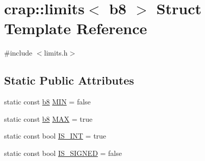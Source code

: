 \hypertarget{structcrap_1_1limits_3_01b8_01_4}{\section{crap\-:\-:limits$<$ b8 $>$ Struct Template Reference}
\label{structcrap_1_1limits_3_01b8_01_4}
}


{\ttfamily \#include $<$limits.\-h$>$}

\subsection*{Static Public Attributes}
\begin{DoxyCompactItemize}
\item 
static const \hyperlink{types_8h_a74eb47b4ab9e428eab7b91b3b877fa6c}{b8} \hyperlink{structcrap_1_1limits_3_01b8_01_4_ad7cee023c6e3c4ee5f1827e5becc110d}{M\-I\-N} = false
\item 
static const \hyperlink{types_8h_a74eb47b4ab9e428eab7b91b3b877fa6c}{b8} \hyperlink{structcrap_1_1limits_3_01b8_01_4_abb6122e7510a3d43e1e95a2543af6c0d}{M\-A\-X} = true
\item 
static const bool \hyperlink{structcrap_1_1limits_3_01b8_01_4_ade07f706657b5325f1d424710e1451c3}{I\-S\-\_\-\-I\-N\-T} = true
\item 
static const bool \hyperlink{structcrap_1_1limits_3_01b8_01_4_a08b3d51e6a03bb60785009fd3d68077b}{I\-S\-\_\-\-S\-I\-G\-N\-E\-D} = false
\end{DoxyCompactItemize}


